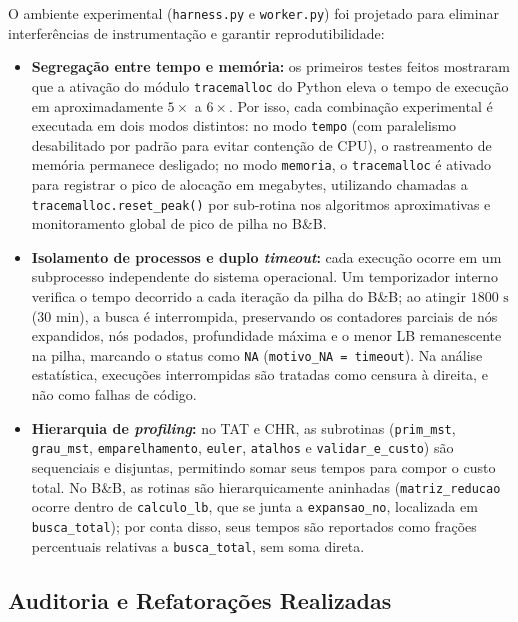 \documentclass[12pt]{article}
\begin{document}
O ambiente experimental (\texttt{harness.py} e \texttt{worker.py}) foi projetado para eliminar interferências de instrumentação e garantir reprodutibilidade:

\begin{itemize}
    \item \textbf{Segregação entre tempo e memória:} os primeiros testes feitos mostraram que a ativação do módulo \texttt{tracemalloc} do Python eleva o tempo de execução em aproximadamente $5\times$ a $6\times$. Por isso, cada combinação experimental é executada em dois modos distintos: no modo \texttt{tempo} (com paralelismo desabilitado por padrão para evitar contenção de CPU), o rastreamento de memória permanece desligado; no modo \texttt{memoria}, o \texttt{tracemalloc} é ativado para registrar o pico de alocação em megabytes, utilizando chamadas a \texttt{tracemalloc.reset\_peak()} por sub-rotina nos algoritmos aproximativas e monitoramento global de pico de pilha no B\&B.
    \item \textbf{Isolamento de processos e duplo \textit{timeout}:} cada execução ocorre em um subprocesso independente do sistema operacional. Um temporizador interno verifica o tempo decorrido a cada iteração da pilha do B\&B; ao atingir $1800\text{ s}$ ($30\text{ min}$), a busca é interrompida, preservando os contadores parciais de nós expandidos, nós podados, profundidade máxima e o menor LB remanescente na pilha, marcando o status como \texttt{NA} (\texttt{motivo\_NA = timeout}). Na análise estatística, execuções interrompidas são tratadas como censura à direita, e não como falhas de código.
    \item \textbf{Hierarquia de \textit{profiling}:} no TAT e CHR, as subrotinas (\texttt{prim\_mst}, \texttt{grau\_mst}, \texttt{emparelhamento}, \texttt{euler}, \texttt{atalhos} e \texttt{validar\_e\_custo}) são sequenciais e disjuntas, permitindo somar seus tempos para compor o custo total. No B\&B, as rotinas são hierarquicamente aninhadas (\texttt{matriz\_reducao} ocorre dentro de \texttt{calculo\_lb}, que se junta a \texttt{expansao\_no}, localizada em \texttt{busca\_total}); por conta disso, seus tempos são reportados como frações percentuais relativas a \texttt{busca\_total}, sem soma direta.
\end{itemize}

\subsection{Auditoria e Refatorações Realizadas}
\end{document}
